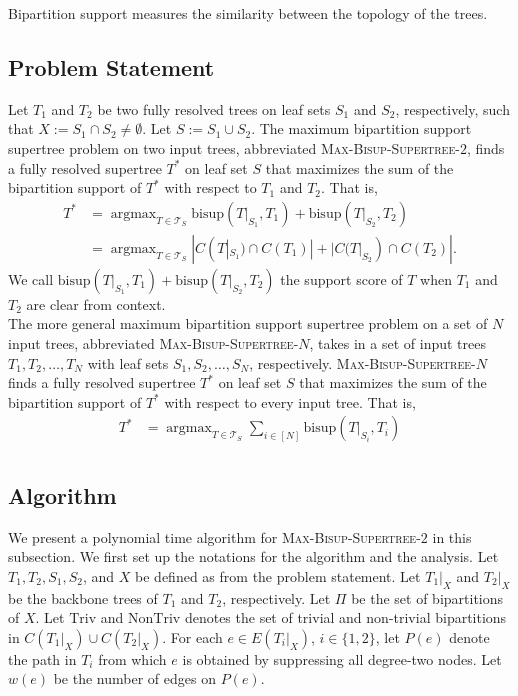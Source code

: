 \documentclass{bmcart}
\newcommand{\triv}{\mathrm{Triv}}
\newcommand{\ntriv}{\mathrm{NonTriv}}
\newcommand{\bs}{\mathrm{bisup}}
\DeclareMathOperator*{\argmax}{argmax}
\begin{document}
Bipartition support measures the similarity between the topology of the trees.

\subsection{Problem Statement}
Let $T_1$ and $T_2$ be two fully resolved trees on leaf sets $S_1$ and $S_2$, respectively, such that $X := S_1 \cap S_2 \neq \emptyset$. Let $S := S_1 \cup S_2$. The maximum bipartition support supertree problem on two input trees, abbreviated \textsc{Max-Bisup-Supertree-$2$}, finds a fully resolved supertree $T^*$ on leaf set $S$ that maximizes the sum of the bipartition support of $T^*$ with respect to $T_1$ and $T_2$. That is, 
\begin{align*}
    T^* &= \argmax_{T \in \mathcal{T}_S} \bs(T|_{S_1}, T_1) + \bs(T|_{S_2}, T_2)\\ 
        &= \argmax_{T \in \mathcal{T}_S} |C(T|_{S_1})\cap C(T_1)| + |C(T|_{S_2}) \cap C(T_2)|.
\end{align*}
We call $\bs(T|_{S_1}, T_1) + \bs(T|_{S_2}, T_2)$ the support score of $T$ when $T_1$ and $T_2$ are clear from context.\\

The more general maximum bipartition support supertree problem on a set of $N$ input trees, abbreviated \textsc{Max-Bisup-Supertree-$N$}, takes in a set of input trees $T_1,T_2,\dots,T_N$ with leaf sets $S_1,S_2,\dots,S_N$, respectively. \textsc{Max-Bisup-Supertree-$N$} finds a fully resolved supertree $T^*$ on leaf set $S$ that maximizes the sum of the bipartition support of $T^*$ with respect to every input tree. That is,
\begin{align*}
    T^* &= \argmax_{T \in \mathcal{T}_S} \sum_{i \in [N]} \bs(T|_{S_i}, T_i) \\ 
\end{align*}

\subsection{Algorithm}
We present a polynomial time algorithm for \textsc{Max-Bisup-Supertree-$2$} in this subsection. We first set up the notations for the algorithm and the analysis. Let $T_1,T_2,S_1,S_2$, and $X$ be defined as from the problem statement. Let $T_1|_X$ and $T_2|_X$ be the backbone trees of $T_1$ and $T_2$, respectively. Let $\Pi$ be the set of bipartitions of $X$. Let $\triv$ and $\ntriv$ denotes the set of trivial and non-trivial bipartitions in $C(T_1|_X) \cup C(T_2|_X)$. For each $e \in E(T_i|_X)$, $i \in \{1,2\}$, let $P(e)$ denote the path in $T_i$ from which $e$ is obtained by suppressing all degree-two nodes. Let $w(e)$ be the number of edges on $P(e)$. \\
\end{document}
